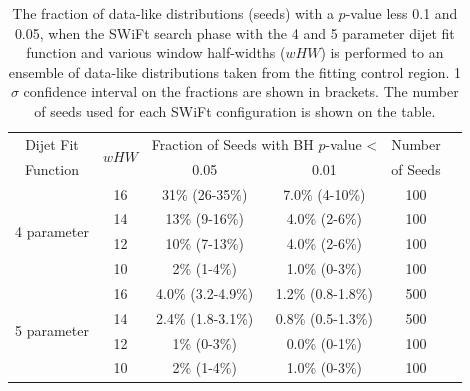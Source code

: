\begin{table}[!ht]
\centering
\begin{tabular}{|c|c||c|c|c|c|}
  \hline
   Dijet Fit  & \multirow{2}{*}{$wHW$} &\multicolumn{2}{c|}{Fraction of Seeds with BH \mbox{$p$-value} \textless} &   Number   \\ \cline{3-4} 
   Function   &                        & 0.05                & 0.01                                               &  of Seeds  \\ 
  \hline
  \multirow{4}{*}{4 parameter} &   16 &  31\%   (26-35\%)   &  7.0\% (4-10\%)  & 100  \\
   &   14 &  13\%   (9-16\%)    &  4.0\% (2-6\%)   & 100  \\
   &   12 &  10\%   (7-13\%)    &  4.0\% (2-6\%)   & 100  \\
   &   10 &  2\%   (1-4\%)      &  1.0\% (0-3\%)   & 100  \\
  \hline
  \multirow{4}{*}{5 parameter} &   16 &  4.0\% (3.2-4.9\%)  &  1.2\% (0.8-1.8\%) & 500  \\
  &   14 &  2.4\% (1.8-3.1\%)  &  0.8\% (0.5-1.3\%) & 500  \\
  &   12 &  1\%   (0-3\%)      &  0.0\%  (0-1\%)  & 100  \\
  &   10 &  2\%   (1-4\%)      &  1.0\%  (0-3\%)  & 100  \\
  \hline
\end{tabular}

\caption[ The fraction of data-like distributions (seeds) 
  with a \bh{} \mbox{$p$-value} less 0.1 and 0.05,
  for the SWiFt search phase performed to an ensemble of data-like distributions
  taken from the \lm{} fitting control region.]
        {\label{tab:bumpH_lm_spuriousSignal}
  The fraction of data-like distributions (seeds) 
  with a \bh{} \mbox{$p$-value} less 0.1 and 0.05,
  when the SWiFt search phase with the 4 and 5 parameter dijet fit function
  and various window half-widths ($wHW$) is performed to an ensemble of data-like distributions
  taken from the \lm{} fitting control region.
  1$\sigma$ confidence interval on the fractions are shown in brackets.
  The number of seeds used for each SWiFt configuration is shown on the table.}
\end{table}

